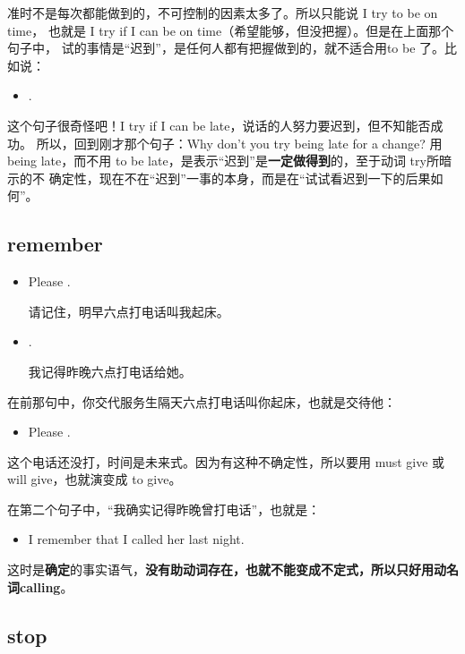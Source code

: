 准时不是每次都能做到的，不可控制的因素太多了。所以只能说 I try to be on time，
也就是 I try if I can be on time（希望能够，但没把握）。但是在上面那个句子中，
试的事情是“迟到”，是任何人都有把握做到的，就不适合用to be 了。比如说：

\begin{itemize}
\item {}  .
\end{itemize}

这个句子很奇怪吧！I try if I can be late，说话的人努力要迟到，但不知能否成功。
所以，回到刚才那个句子：Why don't you try being late for a change? 用 being
late，而不用 to be late，是表示“迟到”是\textbf{一定做得到}的，至于动词 try所暗示的不
确定性，现在不在“迟到”一事的本身，而是在“试试看迟到一下的后果如何”。

\subsection{remember}

\begin{itemize}
\item Please  .

  请记住，明早六点打电话叫我起床。
\item {}  .

  我记得昨晚六点打电话给她。
\end{itemize}

在前那句中，你交代服务生隔天六点打电话叫你起床，也就是交待他：
\begin{itemize}
\item  Please  .
\end{itemize}
这个电话还没打，时间是未来式。因为有这种不确定性，所以要用 must give 或
will give，也就演变成 to give。

在第二个句子中，“我确实记得昨晚曾打电话”，也就是：
\begin{itemize}
\item  I remember that I called her last night.
\end{itemize}
这时是\textbf{确定}的事实语气，\textbf{没有助动词存在，也就不能变成不定式，所以只好用动名
  词calling}。

\subsection{stop}

